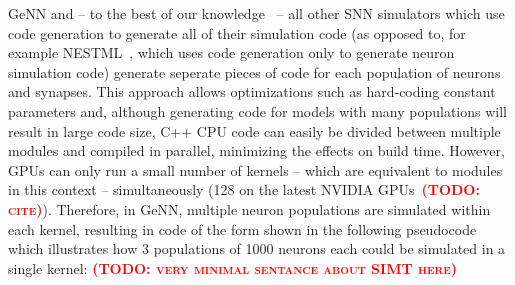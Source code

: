 \documentclass[9pt,twocolumn,twoside,lineno]{pnas-new}
\newcommand{\todo}[1]{\textbf{\textsc{\textcolor{red}{(TODO: #1)}}}}
\begin{document}
GeNN and -- to the best of our knowledge~\citep{Blundell2018} -- all other SNN simulators which use code generation to generate all of their simulation code (as opposed to, for example NESTML~\citep{Plotnikov2016}, which uses code generation only to generate neuron simulation code) generate seperate pieces of code for each population of neurons and synapses.
This approach allows optimizations such as hard-coding constant parameters and, although generating code for models with many populations will result in large code size, C++ CPU code can easily be divided between multiple modules and compiled in parallel, minimizing the effects on build time.
However, GPUs can only run a small number of kernels -- which are equivalent to modules in this context --  simultaneously (128 on the latest NVIDIA GPUs~\todo{cite}).
Therefore, in GeNN, multiple neuron populations are simulated within each kernel, resulting in code of the form shown in the following pseudocode which illustrates how 3 populations of 1000 neurons each could be simulated in a single kernel:
\todo{very minimal sentance about SIMT here}
\end{document}
